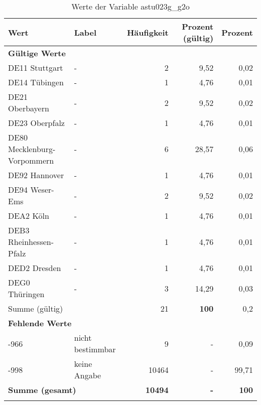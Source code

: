      \begin{longtable}{Xlrrr}
     \toprule
     \textbf{Wert} & \textbf{Label} & \textbf{Häufigkeit} & \textbf{Prozent (gültig)} & \textbf{Prozent} \\
     \endhead
     \midrule
     \multicolumn{5}{l}{\textbf{Gültige Werte}}\\

     \multicolumn{1}{X}{DE11 Stuttgart} &
     - &
     2 &
     9,52 &
     0,02 \\

     \multicolumn{1}{X}{DE14 Tübingen} &
     - &
     1 &
     4,76 &
     0,01 \\

     \multicolumn{1}{X}{DE21 Oberbayern} &
     - &
     2 &
     9,52 &
     0,02 \\

     \multicolumn{1}{X}{DE23 Oberpfalz} &
     - &
     1 &
     4,76 &
     0,01 \\

     \multicolumn{1}{X}{DE80 Mecklenburg-Vorpommern} &
     - &
     6 &
     28,57 &
     0,06 \\

     \multicolumn{1}{X}{DE92 Hannover} &
     - &
     1 &
     4,76 &
     0,01 \\

     \multicolumn{1}{X}{DE94 Weser-Ems} &
     - &
     2 &
     9,52 &
     0,02 \\

     \multicolumn{1}{X}{DEA2 Köln} &
     - &
     1 &
     4,76 &
     0,01 \\

     \multicolumn{1}{X}{DEB3 Rheinhessen-Pfalz} &
     - &
     1 &
     4,76 &
     0,01 \\

     \multicolumn{1}{X}{DED2 Dresden} &
     - &
     1 &
     4,76 &
     0,01 \\

     \multicolumn{1}{X}{DEG0 Thüringen} &
     - &
     3 &
     14,29 &
     0,03 \\
     \midrule
      \multicolumn{2}{l}{Summe (gültig)} & 21 &
      \textbf{100} &
         0,2 \\
     \multicolumn{5}{l}{\textbf{Fehlende Werte}}\\
       -966 & nicht bestimmbar & 9 & - & 0,09 \\

       -998 & keine Angabe & 10464 & - & 99,71 \\

     \midrule
     \multicolumn{2}{l}{\textbf{Summe (gesamt)}} & \textbf{10494} & \textbf{-} & \textbf{100} \\
     \bottomrule
     \caption{Werte der Variable astu023g\_g2o}
     \end{longtable}
     
